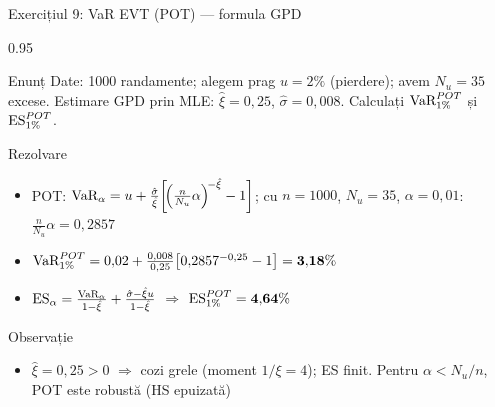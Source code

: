 \documentclass[9pt, aspectratio=169, t]{beamer}
\begin{document}
\begin{frame}[shrink=10]{Exercițiul 9: VaR EVT (POT) --- formula GPD}
    \begin{cminipage}{0.95\textwidth}
    \begin{block}{Enunț}
    Date: 1000 randamente; alegem prag $u = 2\%$ (pierdere); avem $N_u = 35$ excese.
    Estimare GPD prin MLE: $\hat{\xi} = 0{,}25$, $\hat{\sigma} = 0{,}008$.
    Calculați $\text{VaR}^{POT}_{1\%}$ și $\text{ES}^{POT}_{1\%}$.
    \end{block}
    \vspace{0.1cm}
    \begin{exampleblock}{Rezolvare}
    \begin{itemize}\setlength{\itemsep}{0pt}
        \item POT: $\text{VaR}_\alpha = u + \frac{\hat{\sigma}}{\hat{\xi}}\!\left[\!\left(\frac{n}{N_u}\alpha\right)^{\!-\hat{\xi}} - 1\right]$; cu $n=1000$, $N_u=35$, $\alpha=0{,}01$: $\frac{n}{N_u}\alpha = 0{,}2857$
        \item $\text{VaR}_{1\%}^{POT} = 0{,}02 + \frac{0{,}008}{0{,}25}\!\left[0{,}2857^{-0{,}25} - 1\right] = \mathbf{3{,}18\%}$
        \item $\text{ES}_\alpha = \frac{\text{VaR}_\alpha}{1-\hat{\xi}} + \frac{\hat{\sigma} - \hat{\xi}u}{1-\hat{\xi}}$ $\Rightarrow$ $\text{ES}_{1\%}^{POT} = \mathbf{4{,}64\%}$
    \end{itemize}
    \end{exampleblock}
    \begin{alertblock}{Observație}
    \begin{itemize}\setlength{\itemsep}{0pt}
        \item $\hat{\xi} = 0{,}25 > 0$ $\Rightarrow$ cozi grele (moment $1/\xi = 4$); ES finit. Pentru $\alpha < N_u/n$, POT este robustă (HS epuizată)
    \end{itemize}
    \end{alertblock}
    \end{cminipage}
\end{frame}
\end{document}
